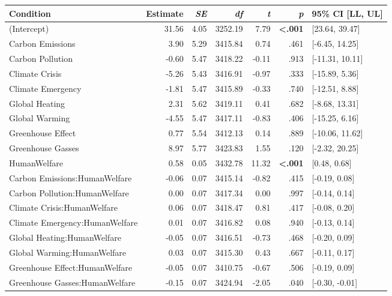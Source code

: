 \begin{table}[ht]
\centering
\begin{tabular}{lrrrrrl}
  \hline
Condition & Estimate & \textit{SE} & \textit{df} & \textit{t} & \textit{p} & 95\% CI [LL, UL] \\ 
  \hline
(Intercept) & 31.56 & 4.05 & 3252.19 & 7.79 & \textbf{\textless  .001} & [23.64, 39.47] \\ 
  Carbon Emissions & 3.90 & 5.29 & 3415.84 & 0.74 & .461 & [-6.45, 14.25] \\ 
  Carbon Pollution & -0.60 & 5.47 & 3418.22 & -0.11 & .913 & [-11.31, 10.11] \\ 
  Climate Crisis & -5.26 & 5.43 & 3416.91 & -0.97 & .333 & [-15.89, 5.36] \\ 
  Climate Emergency & -1.81 & 5.47 & 3415.89 & -0.33 & .740 & [-12.51, 8.88] \\ 
  Global Heating & 2.31 & 5.62 & 3419.11 & 0.41 & .682 & [-8.68, 13.31] \\ 
  Global Warming & -4.55 & 5.47 & 3417.11 & -0.83 & .406 & [-15.25, 6.16] \\ 
  Greenhouse Effect & 0.77 & 5.54 & 3412.13 & 0.14 & .889 & [-10.06, 11.62] \\ 
  Greenhouse Gasses & 8.97 & 5.77 & 3423.83 & 1.55 & .120 & [-2.32, 20.25] \\ 
  HumanWelfare & 0.58 & 0.05 & 3432.78 & 11.32 & \textbf{\textless  .001} & [0.48, 0.68] \\ 
  Carbon Emissions:HumanWelfare & -0.06 & 0.07 & 3415.14 & -0.82 & .415 & [-0.19, 0.08] \\ 
  Carbon Pollution:HumanWelfare & 0.00 & 0.07 & 3417.34 & 0.00 & .997 & [-0.14, 0.14] \\ 
  Climate Crisis:HumanWelfare & 0.06 & 0.07 & 3418.47 & 0.81 & .417 & [-0.08, 0.20] \\ 
  Climate Emergency:HumanWelfare & 0.01 & 0.07 & 3416.82 & 0.08 & .940 & [-0.13, 0.14] \\ 
  Global Heating:HumanWelfare & -0.05 & 0.07 & 3416.51 & -0.73 & .468 & [-0.20, 0.09] \\ 
  Global Warming:HumanWelfare & 0.03 & 0.07 & 3415.30 & 0.43 & .667 & [-0.11, 0.17] \\ 
  Greenhouse Effect:HumanWelfare & -0.05 & 0.07 & 3410.75 & -0.67 & .506 & [-0.19, 0.09] \\ 
  Greenhouse Gasses:HumanWelfare & -0.15 & 0.07 & 3424.94 & -2.05 & .040 & [-0.30, -0.01] \\ 
   \hline
\end{tabular}
\end{table}
